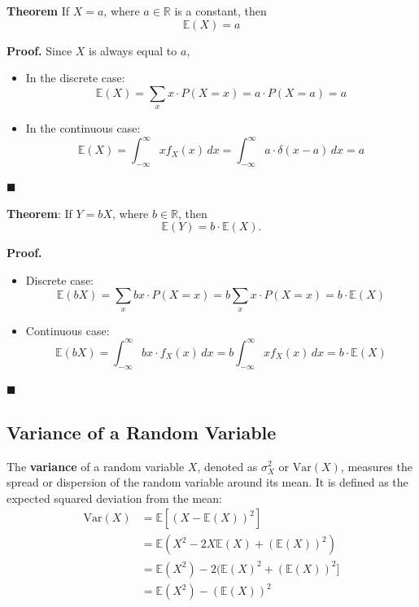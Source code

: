 \documentclass[twoside]{book}
\begin{document}
\begin{textbox}
\textbf{Theorem} If \( X = a \), where \( a \in \mathbb{R} \) is a constant, then  
\[
\mathbb{E}(X) = a
\]
\end{textbox}

\textbf{Proof.}  
Since \( X \) is always equal to \( a \),  
\begin{itemize}
  \item In the discrete case:
  \[
  \mathbb{E}(X) = \sum_{x} x \cdot P(X = x) = a \cdot P(X = a) = a
  \]
  \item In the continuous case:
  \[
  \mathbb{E}(X) = \int_{-\infty}^{\infty} x f_X(x) \, dx = \int_{-\infty}^{\infty} a \cdot \delta(x - a) \, dx = a
  \]
\end{itemize}
\hfill\(\blacksquare\)

\vspace{1em}

\begin{textbox}
\textbf{Theorem}: If \( Y = bX \), where \( b \in \mathbb{R} \), then  
\[
\mathbb{E}(Y) = b \cdot \mathbb{E}(X).
\]
\end{textbox}

\textbf{Proof.}  
\begin{itemize}
  \item Discrete case:
  \[
  \mathbb{E}(bX) = \sum_{x} b x \cdot P(X = x) = b \sum_{x} x \cdot P(X = x) = b \cdot \mathbb{E}(X)
  \]
  \item Continuous case:
  \[
  \mathbb{E}(bX) = \int_{-\infty}^{\infty} b x \cdot f_X(x) \, dx = b \int_{-\infty}^{\infty} x f_X(x) \, dx = b \cdot \mathbb{E}(X)
  \]
\end{itemize}
\hfill\(\blacksquare\)


\subsection{Variance of a Random Variable}

The \textbf{variance} of a random variable \( X \), denoted as $\sigma_X^2$ or \( \text{Var}(X) \), measures the spread or dispersion of the random variable around its mean. It is defined as the expected squared deviation from the mean:
\begin{align*}
\text{Var}(X) &= \mathbb{E}[(X - \mathbb{E}(X))^2] \\
&=\mathbb{E}(X^2 - 2X\mathbb{E}(X) + (\mathbb{E}(X))^2) \\
&=\mathbb{E}(X^2)- 2(\mathbb{E}(X)^2 + (\mathbb{E}(X))^2] \\
&= \mathbb{E}(X^2) - (\mathbb{E}(X))^2
\end{align*}
\end{document}
